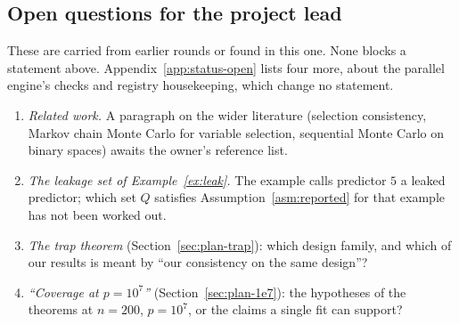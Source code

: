 \subsection{Open questions for the project lead}\label{sec:open-hq}

These are carried from earlier rounds or found in this one. None blocks a statement above. Appendix~\ref{app:status-open}
lists four more, about the parallel engine's checks and registry housekeeping, which change no statement.
\begin{enumerate}[leftmargin=1.6em,itemsep=1pt]
  \item \emph{Related work.} A paragraph on the wider literature (selection consistency, Markov chain Monte Carlo for
    variable selection, sequential Monte Carlo on binary spaces) awaits the owner's reference list.
  \item \emph{The leakage set of Example~\ref{ex:leak}.} The example calls predictor $5$ a leaked predictor; which set $Q$
    satisfies Assumption~\ref{asm:reported} for that example has not been worked out.
  \item \emph{The trap theorem} (Section~\ref{sec:plan-trap}): which design family, and which of our results is meant by
    ``our consistency on the same design''?
  \item \emph{``Coverage at $p=10^7$''} (Section~\ref{sec:plan-1e7}): the hypotheses of the theorems at $n=200$,
    $p=10^7$, or the claims a single fit can support?
\end{enumerate}
